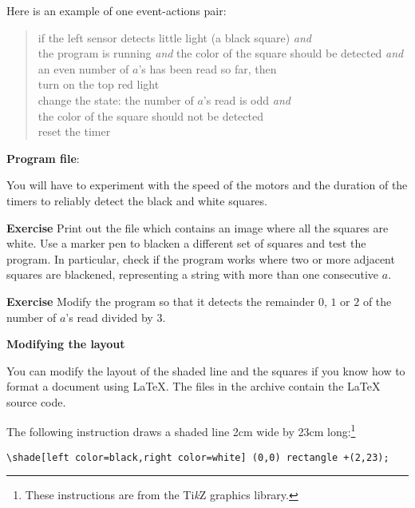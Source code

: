 Here is an example of one event-actions pair:


\begin{quote}
if the left sensor detects little light (a black square) \emph{and}\\
\hspace*{1em} the program is running \emph{and}
the color of the square should be detected \emph{and}\\
\hspace*{1em} an even number of $a$'s has been read so far, then\\
\hspace*{2em} turn on the top red light\\
\hspace*{2em} change the state: the number of $a$'s
read is odd \emph{and}\\
\hspace*{4em} the color of the square should not be detected\\
\hspace*{2em} reset the timer
\end{quote}

{\raggedleft \hfill \textbf{Program file}: }

You will have to experiment with the speed of the motors and the
duration of the timers to reliably detect the black and white squares.

\textbf{Exercise} Print out the file  which
contains an image where all the squares are white. Use a marker pen to
blacken a different set of squares and test the program. In particular,
check if the program works where two or more adjacent squares are
blackened, representing a string with more than one consecutive $a$.

\textbf{Exercise} Modify the program so that it detects the remainder
$0$, $1$ or $2$ of the number of $a$'s read divided by $3$.

\bigskip

\textbf{Modifying the layout}

You can modify the layout of the shaded line and the squares if you
know how to format a document using \LaTeX{}. The files  in the archive contain the \LaTeX{} source code. 

The following instruction draws a shaded line 2cm wide by 23cm
 long:\footnote{These instructions are from the Ti\textit{k}Z
graphics library.}
\begin{footnotesize}
\begin{verbatim}
\shade[left color=black,right color=white] (0,0) rectangle +(2,23);
\end{verbatim}
\end{footnotesize}

